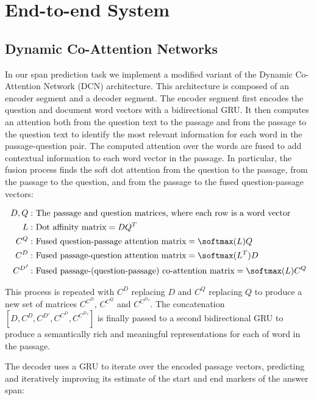 

\section{End-to-end System}

\subsection{Dynamic Co-Attention Networks}

In our span prediction task we implement a modified variant of the Dynamic Co-Attention Network (DCN) architecture. This architecture is composed of an encoder segment and a decoder segment. The encoder segment first encodes the question and document word vectors with a bidirectional GRU. It then computes an attention both from the question text to the passage and from the passage to the question text to identify the most relevant information for each word in the passage-question pair. The computed attention over the words are fused to add contextual information to each word vector in the passage. In particular, the fusion process finds the soft dot attention from the question to the passage, from the passage to the question, and from the passage to the fused question-passage vectors:

\begin{align*}
D, Q: &\text{ The passage and question matrices, where each row is a word vector} \\
L: &\text{ Dot affinity matrix} = D Q^T \\
C^Q: &\text{ Fused question-passage attention matrix} = \softmax(L) Q \\
C^D: &\text{ Fused passage-question attention matrix} = \softmax(L^T) D \\
{C^D}': &\text{ Fused passage-(question-passage) co-attention matrix} = \softmax(L) C^Q \\
\end{align*}

This process is repeated with $C^D$ replacing $D$ and $C^Q$ replacing $Q$ to produce a new set of matrices $C^{C^D}$, $C^{C^Q}$ and $C^{C^D \prime}$. The concatenation $[D, C^D, C^{D \prime}, C^{C^D}, C^{C^D \prime}]$ is finally passed to a second bidirectional GRU to produce a semantically rich and meaningful representations for each of word in the passage.

The decoder uses a GRU to iterate over the encoded passage vectors, predicting and iteratively improving its estimate of the start and end markers of the answer span:

